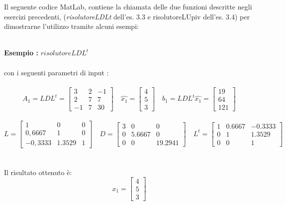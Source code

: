 Il seguente codice MatLab, contiene la chiamata delle due funzioni descritte negli esercizi precedenti, (\textit{risolutoreLDLt}  dell'es. 3.3 e risolutoreLUpiv dell'es. 3.4) per dimostrarne l'utilizzo tramite alcuni esempi:\\\

\begin{description}
\item \textbf{Esempio :} \textit{$risolutoreLDL^t$}\\\\
	con i seguenti parametri di input :\\\	 
	\[
	A_1 = LDL^t =\begin{bmatrix}
		 3 & 2 & -1 \\ 
		 2 & 7 &  7 \\
		-1 & 7 & 30 
	\end{bmatrix} \quad
	\hat{x_1} =\begin{bmatrix}
		4 \\
		5 \\
		3                
	\end{bmatrix} \quad
	b_1 = LDL^t \hat{x_1} =\begin{bmatrix}
		19 \\
		64 \\
		121                
	\end{bmatrix}
	\]\\
	\[
	L =\begin{bmatrix}
		   1   &   0    & 0 \\ 
		0,6667 &   1    & 0 \\
	   -0,3333 & 1.3529 & 1 
	\end{bmatrix} \quad
	D =\begin{bmatrix}
		3 &   0    &   0    \\ 
		0 & 5.6667 &   0    \\
		0 &   0    & 19.2941 
	\end{bmatrix} \quad
	L^t =\begin{bmatrix}
		1 & 0.6667 & -0.3333 \\ 
		0 &    1   &  1.3529 \\
		0 &    0   &    1 
	\end{bmatrix}
	\]\\\\
	Il risultato ottenuto è:\\
	\[
	x_1 =\begin{bmatrix}
		4 \\
		5 \\
		3                

\end{bmatrix}\]
\end{description}
